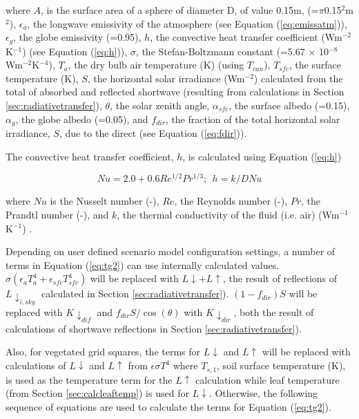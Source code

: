 \documentclass[preprint,12pt,authoryear]{elsarticle}
\begin{document}
where $A$, is the surface area of a sphere of diameter D, of value 0.15m, (=$\pi$0.15$^{2}$m$^{2}$),
$\epsilon_{a}$, the longwave emissivity of the atmosphere (see Equation (\ref{eq:emissatm})), 
$\epsilon_{g}$, the globe emissivity (=0.95), 
$h$, the convective heat transfer coefficient (Wm$^{-2}$K$^{-1}$) (see Equation (\ref{eq:h})), 
$\sigma$, the Stefan-Boltzmann constant (=5.67 $\times$ 10$^{-8}$Wm$^{-2}$K$^{-4}$), 
$T_{a}$, the dry bulb air temperature (K) (using $T_{can}$), 
$T_{sfc}$, the surface temperature (K), 
$S$, the horizontal solar irradiance (Wm$^{-2}$) calculated from the total of absorbed and reflected shortwave (resulting from calculations in Section \ref{sec:radiativetransfer}), 
$\theta$, the solar zenith angle, 
$\alpha_{sfc}$, the surface albedo (=0.15),  
$\alpha_{g}$, the globe albedo (=0.05), and 
$f_{dir}$, the fraction of the total horizontal solar irradiance, $S$, due to the direct (see Equation (\ref{eq:fdir})). 

The convective heat transfer coefficient, $h$, is calculated using Equation (\ref{eq:h})

\begin{equation}\label{eq:h}
Nu = 2.0 + 0.6Re^{1/2}Pr^{1/3};  ~~h = k / D Nu
\end{equation}

where $Nu$ is the Nusselt number (-),
$Re$, the Reynolds number (-),
$Pr$, the Prandtl number (-), and 
$k$, the thermal conductivity of the fluid (i.e. air) (Wm$^{-1}$K$^{-1}$) \citep{Liljegren2008}.

Depending on user defined scenario model configuration settings, a number of terms in Equation (\ref{eq:tg2}) can use internally calculated values. $\sigma(\epsilon_{a} T_{a}^{4} + \epsilon_{sfc} T_{sfc}^{4} )$ will be replaced with $L\downarrow + L\uparrow$, the result of reflections of $L \downarrow_{i,sky}$ calculated in Section \ref{sec:radiativetransfer}). $(1-f_{dir})S$ will be replaced with $K \downarrow_{dif}$ and $f_{dir}S/ \cos(\theta)$ with $K \downarrow_{dir}$, both the result of calculations of shortwave reflections in Section \ref{sec:radiativetransfer}). 

Also, for vegetated grid squares, the terms for $L\downarrow$ and $L\uparrow$ will be replaced with calculations of $L\downarrow$ and $L\uparrow$ from $\epsilon \sigma T^{4}$ where $T_{s,1}$, soil surface temperature (K), is used as the temperature term for the $L\uparrow$ calculation while leaf temperature (from Section \ref{sec:calcleaftemp}) is used for $L\downarrow$. Otherwise, the following sequence of equations are used to calculate the terms for Equation (\ref{eq:tg2}).
\end{document}
